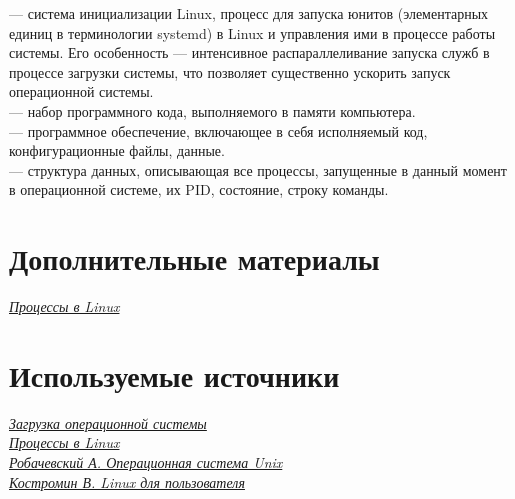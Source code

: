 \documentclass[14pt, a4paper]{article}
\begin{document}
\noindent \href{https://ru.wikipedia.org/wiki/Systemd}{} — система инициализации Linux, процесс для запуска юнитов (элементарных единиц в
терминологии systemd) в Linux и управления ими в процессе работы системы. Его особенность —
интенсивное распараллеливание запуска служб в процессе загрузки системы, что позволяет
существенно ускорить запуск операционной системы.\\

\noindent \href{https://ru.wikipedia.org/wiki/Процесс_(информатика)}{} — набор программного кода, выполняемого в памяти компьютера.\\

\noindent \href{https://ru.wikipedia.org/wiki/Компьютерная_программа}{} — программное обеспечение, включающее в себя исполняемый код, конфигурационные
файлы, данные.\\

\noindent \href{https://wm-help.net/lib/b/book/1696396857/275}{} — структура данных, описывающая все процессы, запущенные в данный момент
в операционной системе, их PID, состояние, строку команды.

\section*{Дополнительные материалы} 

\href{https://habr.com/ru/post/423049/}{\textit{Процессы в Linux}}

\section*{Используемые источники} 

\href{https://habr.com/ru/post/113350/}{\textit{Загрузка операционной системы}}\\

\noindent \href{https://www.linuxcenter.ru/lib/articles/system/linux_processes.phtml}{\textit{Процессы в Linux}}\\

\noindent \href{https://it.wikireading.ru/6468}{\textit{Робачевский А. Операционная система Unix}}\\

\noindent \href{https://www.linuxcenter.ru/lib/books/kostromin}{\textit{Костромин В. Linux для пользователя}}
\end{document}
